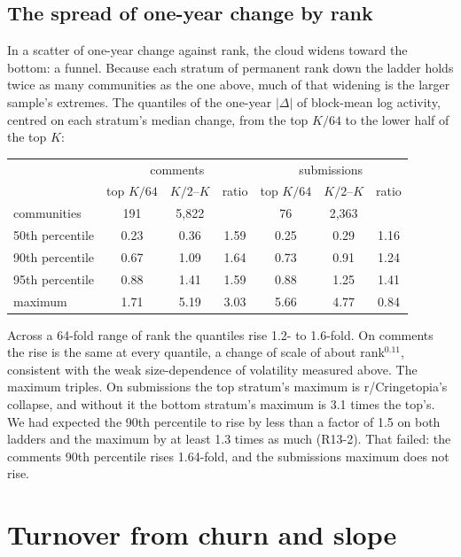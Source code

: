 \documentclass[10pt]{article}
\begin{document}
\subsection{The spread of one-year change by rank}
In a scatter of one-year change against rank, the cloud widens toward the bottom: a funnel. Because each stratum of permanent rank down the ladder holds twice as many communities as the one above, much of that widening is the larger sample's extremes. The quantiles of the one-year $|\Delta|$ of block-mean log activity, centred on each stratum's median change, from the top $K/64$ to the lower half of the top $K$:
\begin{center}\small\begin{tabular}{lcccccc}
\toprule
 & \multicolumn{3}{c}{comments} & \multicolumn{3}{c}{submissions}\\
 & top $K/64$ & $K/2$--$K$ & ratio & top $K/64$ & $K/2$--$K$ & ratio\\
\midrule
communities & 191 & 5,822 & & 76 & 2,363 & \\
50th percentile & 0.23 & 0.36 & 1.59 & 0.25 & 0.29 & 1.16\\
90th percentile & 0.67 & 1.09 & 1.64 & 0.73 & 0.91 & 1.24\\
95th percentile & 0.88 & 1.41 & 1.59 & 0.88 & 1.25 & 1.41\\
maximum & 1.71 & 5.19 & 3.03 & 5.66 & 4.77 & 0.84\\
\bottomrule
\end{tabular}\end{center}
Across a 64-fold range of rank the quantiles rise 1.2- to 1.6-fold. On comments the rise is the same at every quantile, a change of scale of about rank$^{0.11}$, consistent with the weak size-dependence of volatility measured above. The maximum triples. On submissions the top stratum's maximum is r/Cringetopia's collapse, and without it the bottom stratum's maximum is 3.1 times the top's. We had expected the 90th percentile to rise by less than a factor of 1.5 on both ladders and the maximum by at least 1.3 times as much (R13-2). That failed: the comments 90th percentile rises 1.64-fold, and the submissions maximum does not rise.

\section{Turnover from churn and slope}\label{sec:turnover}
\end{document}

